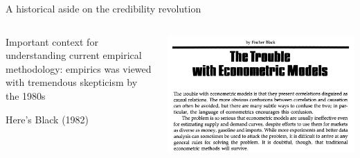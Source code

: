 \documentclass[notes,11pt, aspectratio=169]{beamer}
\newenvironment{wideitemize}{\itemize\addtolength{\itemsep}{10pt}}{\enditemize}
\begin{document}
\begin{frame}{A historical aside on the credibility revolution}
\begin{columns}[T] %
  \begin{column}{.4\textwidth}
    \begin{wideitemize}
    \item Important context for understanding current empirical
      methodology: empirics was viewed with tremendous skepticism by the 1980s
    \item Here's Black (1982)
    \end{wideitemize}
\end{column}%
\hfill%
\begin{column}{.6\textwidth}
    \includegraphics[width=0.9\linewidth]{images/black1.png}\\
\end{column}%
\end{columns}
\end{frame}
\end{document}
